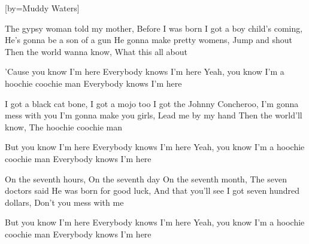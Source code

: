 

[by=Muddy Waters]

\begin{LARGE}


\beginverse
The gypsy woman told my mother, Before I was born
I got a boy child's coming, He's gonna be a son of a gun
He gonna make pretty womens, Jump and shout
Then the world wanna know, What this all about

'Cause you know I'm here
Everybody knows I'm here
Yeah, you know I'm a hoochie coochie man
Everybody knows I'm here
\endverse

\beginverse
I got a black cat bone, I got a mojo too
I got the Johnny Concheroo, I'm gonna mess with you
I'm gonna make you girls, Lead me by my hand
Then the world'll know, The hoochie coochie man

But you know I'm here
Everybody knows I'm here
Yeah, you know I'm a hoochie coochie man
Everybody knows I'm here
\endverse

\beginverse
On the seventh hours, On the seventh day
On the seventh month, The seven doctors said
He was born for good luck, And that you'll see
I got seven hundred dollars, Don't you mess with me

But you know I'm here
Everybody knows I'm here
Yeah, you know I'm a hoochie coochie man
Everybody knows I'm here
\endverse

\end{LARGE}


\chordson
\endsong
